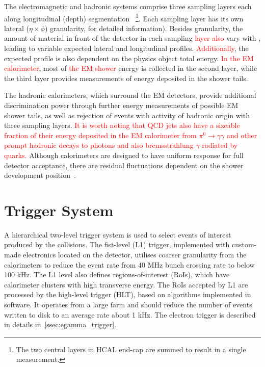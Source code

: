 The electromagnetic and hadronic systems comprise three sampling layers each along longitudinal (depth) segmentation ~\cite{PERF-2007-01}\footnote{The two
central layers in HCAL end-cap are summed to result in a single measurement.}.
Each sampling layer has its own lateral ($\eta\times\phi$) granularity, for detailed information). Besides granularity, the amount of material in front of the detector in each sampling \textcolor{red}{layer also} vary with \abseta, leading to variable expected lateral and longitudinal profiles. \textcolor{red}{Additionally}, the expected
profile is also dependent on the physics object total energy. \textcolor{red}{In the EM calorimeter}, most of \textcolor{red}{the EM shower} energy is collected in the second layer, while the third layer provides measurements
of energy deposited in the shower tails. %


The hadronic calorimeters, which surround the EM detectors,
provide additional discrimination power through further energy measurements of
possible EM shower tails, as well as rejection of events with activity of
hadronic origin with three sampling layers. \textcolor{red}{It is worth noting that QCD jets also have a sizeable fraction of their energy deposited in the EM calorimeter from $\pi^{0}\rightarrow\gamma\gamma$
and other prompt hadronic decays to photons and also bremsstrahlung $\gamma$ radiated by quarks.}
Although calorimeters are designed 
to have uniform response for full detector acceptance, there are residual fluctuations 
dependent on the shower development position~\cite{Wigmans2017}.








\section{Trigger System}\label{sec:atlas_trigger}

A hierarchical two-level trigger system is used to select events of interest produced by the collisions. The fist-level (L1) trigger, implemented with custom-made electronics located on the detector, utilises coarser granularity from the calorimeters to reduce the event rate from 40 MHz bunch crossing rate to below 100 kHz. The L1 level also defines regions-of-interest (RoIs), which have calorimeter clusters with high transverse energy. The RoIs accepted by L1 are processed by the high-level trigger (HLT), based on algorithms implemented in software. It operates from a large farm and should reduce the number of events written to disk to an average rate about 1 kHz. The electron trigger is described in details in~\ref{ssec:egamma_trigger}.






